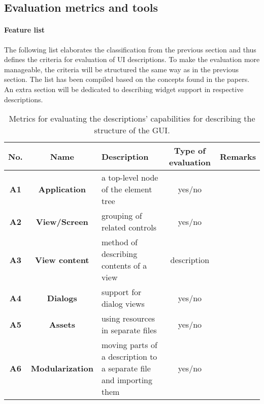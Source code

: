 \subsection{Evaluation metrics and tools}\label{subsec:evaluation-metrics-and-tools}

\paragraph{Feature list}
The following list elaborates the classification from the previous section and thus defines the criteria for evaluation of UI descriptions.
To make the evaluation more manageable, the criteria will be structured the same way as in the previous section.
The list has been compiled based on the concepts found in the papers.
An extra section will be dedicated to describing widget support in respective descriptions.



\begin{table}[]
    \centering
    \caption{Metrics for evaluating the descriptions' capabilities for describing the structure of the GUI.}
    \label{tab:evaluation-metrics-structure}
    \renewcommand{\tabularxcolumn}[1]{>{\normalsize}m{#1}}
    \begin{tabularx}{\textwidth}{ccCcc}
        \toprule
        \textbf{No.} & \textbf{Name}           & \textbf{Description}                                                & \textbf{Type of evaluation} & \textbf{Remarks} \\
        \midrule
        \textbf{A1}  & \textbf{Application}    & a top-level node of the element tree                                & yes/no                      &                  \\
        \textbf{A2}  & \textbf{View/Screen}    & grouping of related controls                                        & yes/no                      &                  \\
        \textbf{A3}  & \textbf{View content}   & method of describing contents of a view                             & description                 &                  \\
        \textbf{A4}  & \textbf{Dialogs}        & support for dialog views                                            & yes/no                      &                  \\
        \textbf{A5}  & \textbf{Assets}         & using resources in separate files                                   & yes/no                      &                  \\
        \textbf{A6}  & \textbf{Modularization} & moving parts of a description to a separate file and importing them & yes/no                      &                  \\
        \bottomrule
    \end{tabularx}
\end{table}

